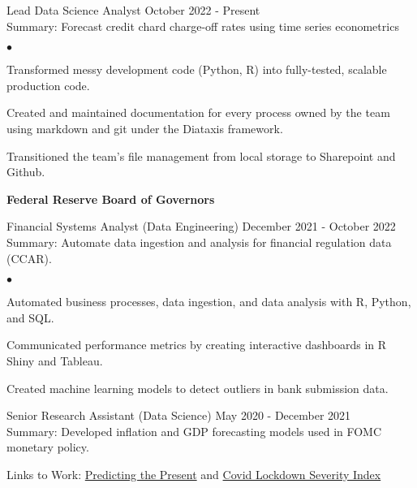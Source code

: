 \documentclass[margin, line]{res}
\newenvironment{list2}{
  \begin{list}{$\bullet$}{%
      \setlength{\itemsep}{0.04in}
      \setlength{\parsep}{0in} \setlength{\parskip}{0in}
      \setlength{\topsep}{0.05in} \setlength{\partopsep}{0in} 
      \setlength{\leftmargin}{\dimexpr 26pt-0.05in}}}
    {\end{list}}
\begin{document}
\begin{resume}
\vspace{-.65cm}
Lead Data Science Analyst \hfill October 2022 - Present\\
\hspace*{3mm} 
    Summary: Forecast credit chard charge-off rates using time series econometrics
\hspace*{3mm}
    \begin{list2}
        \item Transformed messy development code (Python, R) into fully-tested, scalable production code.
        \item Created and maintained documentation for every process owned by the team using markdown and git under the Diataxis framework.
        \item Transitioned the team's file management from local storage to Sharepoint and Github.
    \end{list2}

{\bf Federal Reserve Board of Governors}\\

\vspace{-.65cm}

Financial Systems Analyst (Data Engineering) \hfill December 2021 - October 2022\\
\hspace*{3mm} 
    Summary: Automate data ingestion and analysis for financial regulation data (CCAR).
\hspace*{3mm}
    \begin{list2}
        \item Automated business processes, data ingestion, and data analysis with R, Python, and SQL.
        \item Communicated performance metrics by creating interactive dashboards in R Shiny and Tableau.
        \item Created machine learning models to detect outliers in bank submission data.
    \end{list2}


Senior Research Assistant (Data Science) \hfill May 2020 - December 2021 \\
\hspace*{3mm}
    Summary: Developed inflation and GDP forecasting models used in FOMC monetary policy.
\vspace{-3mm}

\hspace*{3mm}
    Links to Work:  \href{https://michaelboerman.medium.com/predicting-the-present-a56ff704af0b}{Predicting the Present} and   \href{https://github.com/michaelboerman/lockdown_severity_index#readme}{Covid Lockdown Severity Index}
    

\end{resume}
\end{document}
